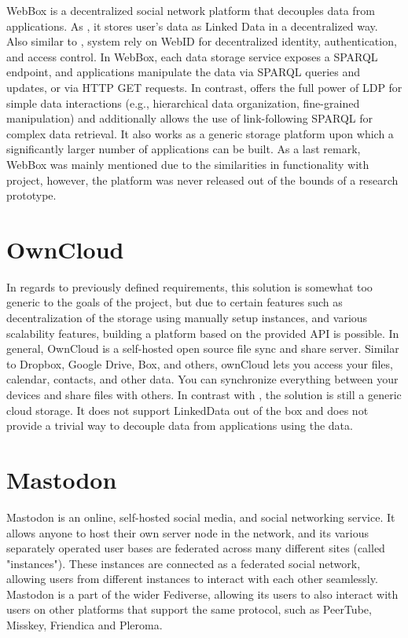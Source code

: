 WebBox is a decentralized social network platform that decouples data from applications. As \solid{}, it stores user’s data as Linked Data in a decentralized way. Also similar to \solid{}, system rely on WebID for decentralized identity, authentication, and access control. In WebBox, each data storage service exposes a SPARQL endpoint, and applications manipulate the data via SPARQL queries and updates, or via HTTP GET requests. In contrast, \solid{} offers the full power of LDP for simple data interactions (e.g., hierarchical data organization, fine-grained manipulation) and additionally allows the use of link-following SPARQL for complex data retrieval. It also works as a generic storage platform upon which a significantly larger number of applications can be built. As a last remark, WebBox was mainly mentioned due to the similarities in functionality with \solid{} project, however, the platform was never released out of the bounds of a research prototype.

\section{OwnCloud}

In regards to previously defined requirements, this solution is somewhat too generic to the goals of the project, but due to certain features such as decentralization of the storage using manually setup instances, and various scalability features, building a platform based on the provided API is possible. In general, OwnCloud is a self-hosted open source file sync and share server. Similar to Dropbox, Google Drive, Box, and others, ownCloud lets you access your files, calendar, contacts, and other data. You can synchronize everything between your devices and share files with others. In contrast with \solid{}, the solution is still a generic cloud storage. It does not support LinkedData out of the box and does not provide a trivial way to decouple data from applications using the data. 

\section{Mastodon}

Mastodon is an online, self-hosted social media, and social networking service. It allows anyone to host their own server node in the network, and its various separately operated user bases are federated across many different sites (called "instances"). These instances are connected as a federated social network, allowing users from different instances to interact with each other seamlessly. Mastodon is a part of the wider Fediverse, allowing its users to also interact with users on other platforms that support the same protocol, such as PeerTube, Misskey, Friendica and Pleroma.

